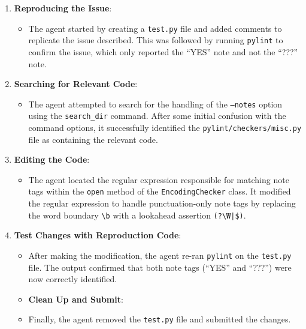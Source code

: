 \begin{enumerate}
    \item \textbf{Reproducing the Issue}:
    \begin{itemize}
        \item The agent started by creating a \texttt{test.py} file and added comments to replicate the issue described.
        This was followed by running \texttt{pylint} to confirm the issue, which only reported the “YES” note and not the “???” note.
    \end{itemize}
    
    \item \textbf{Searching for Relevant Code}:
    \begin{itemize}
        \item The agent attempted to search for the handling of the \texttt{--notes} option using the \texttt{search\_dir} command. After some initial confusion with the command options, it successfully identified the \texttt{pylint/checkers/misc.py} file as containing the relevant code.
    \end{itemize}
    
    \item \textbf{Editing the Code}:
    \begin{itemize}
        \item The agent located the regular expression responsible for matching note tags within the \texttt{open} method of the \texttt{EncodingChecker} class.
        It modified the regular expression to handle punctuation-only note tags by replacing the word boundary \texttt{\textbackslash b} with a lookahead assertion \texttt{(?\=\textbackslash W|\$)}.
    \end{itemize}
    
    \item \textbf{Test Changes with Reproduction Code}:
    \begin{itemize}
        \item After making the modification, the agent re-ran \texttt{pylint} on the \texttt{test.py} file. 
        The output confirmed that both note tags (“YES” and “???”) were now correctly identified.

    \item \textbf{Clean Up and Submit}:
        \item Finally, the agent removed the \texttt{test.py} file and submitted the changes.
    \end{itemize}
\end{enumerate}

